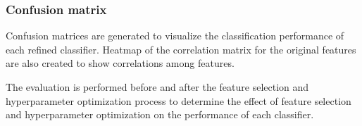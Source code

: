 	\subsubsection{Confusion matrix}
		Confusion matrices are generated to visualize the classification performance of each refined classifier. Heatmap of the correlation matrix for the original features are also created to show correlations among features. 

	The evaluation is performed before and after the feature selection and hyperparameter optimization process to determine the effect of feature selection and hyperparameter optimization on the performance of each classifier. 
	
